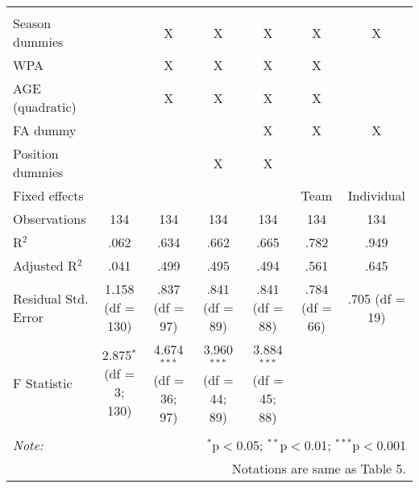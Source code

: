\begin{table}[H]
\begin{tabular}{@{\extracolsep{5pt}}lcccccc}
  & & & & & & \\
\hline \\[-1.8ex]
Season dummies &  & X & X & X & X & X \\
WPA &  & X & X & X & X &  \\
AGE (quadratic) &  & X & X & X & X &  \\
FA dummy &  &  &  & X & X & X \\
Position dummies &  &  & X & X &  &  \\
Fixed effects &  &  &  &  & Team & Individual \\
Observations & 134 & 134 & 134 & 134 & 134 & 134 \\
R$^{2}$ & .062 & .634 & .662 & .665 & .782 & .949 \\
Adjusted R$^{2}$ & .041 & .499 & .495 & .494 & .561 & .645 \\
Residual Std. Error & 1.158 (df = 130) & .837 (df = 97) & .841 (df = 89) & .841 (df = 88) & .784 (df = 66) & .705 (df = 19) \\
F Statistic & 2.875$^{*}$ (df = 3; 130) & 4.674$^{***}$ (df = 36; 97) & 3.960$^{***}$ (df = 44; 89) & 3.884$^{***}$ (df = 45; 88) &  &  \\
\hline
\hline \\[-1.8ex]
\textit{Note:}  & \multicolumn{6}{r}{$^{*}$p$<$0.05; $^{**}$p$<$0.01; $^{***}$p$<$0.001} \\
& \multicolumn{6}{r}{Notations are same as Table 5.} \\
\end{tabular}
\end{table}
